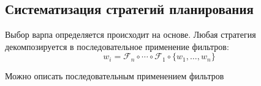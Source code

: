 \subsection{Систематизация стратегий планирования}

Выбор варпа определяется происходит на основе. Любая стратегия декомпозируется в последовательное применение фильтров:
\begin{equation}
    w_i = \mathcal{F}_n \circ \cdots \circ \mathcal{F}_1 \circ \{w_1, \dots, w_n \}
\end{equation}

Можно описать последовательным применением фильтров